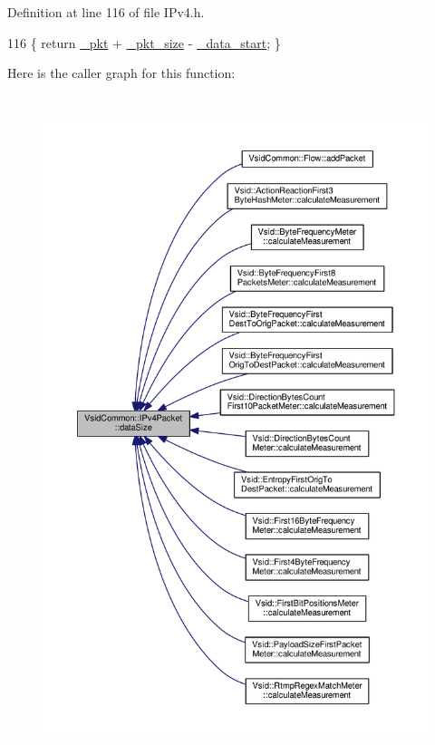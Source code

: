 Definition at line 116 of file I\-Pv4.\-h.


\begin{DoxyCode}
116 \{ \textcolor{keywordflow}{return} \hyperlink{class_vsid_common_1_1_i_pv4_packet_ae39b78b3e02fe344d6a0aaa10bad55b6}{\_pkt} + \hyperlink{class_vsid_common_1_1_i_pv4_packet_a2d4133be37c304ebf4951f975647a2f2}{\_pkt\_size} - \hyperlink{class_vsid_common_1_1_i_pv4_packet_a2caca73de76d8c86e9a003c459188b81}{\_data\_start}; \}
\end{DoxyCode}


Here is the caller graph for this function\-:
\nopagebreak
\begin{figure}[H]
\begin{center}
\leavevmode
\includegraphics[height=550pt]{class_vsid_common_1_1_i_pv4_packet_a39fe36210895625ee87320f5c0c7f52e_icgraph}
\end{center}
\end{figure}


